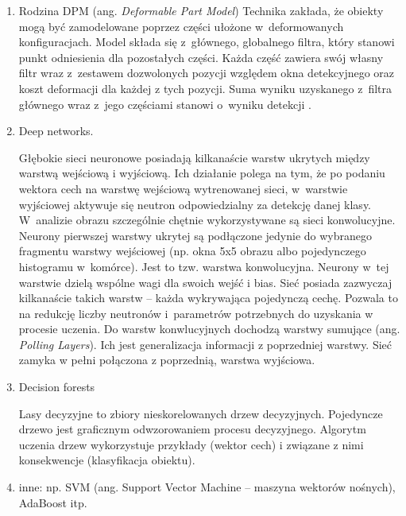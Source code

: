 \begin{enumerate}
\item Rodzina DPM (ang. \textit{Deformable Part Model})
%
Technika zakłada, że obiekty mogą być zamodelowane poprzez części ułożone w~deformowanych konfiguracjach. 
Model składa się z~głównego, globalnego filtra, który stanowi punkt odniesienia dla pozostałych części. 
Każda część zawiera swój własny filtr wraz z~zestawem dozwolonych pozycji względem okna detekcyjnego oraz koszt deformacji dla każdej z tych pozycji. 
Suma wyniku uzyskanego z~filtra głównego wraz z~jego częściami stanowi o~wyniku detekcji \cite{felzenszwalb2008discriminatively}.

\item Deep networks.

Głębokie sieci neuronowe posiadają kilkanaście warstw ukrytych między warstwą wejściową i wyjściową. 
Ich działanie polega na tym, że po podaniu wektora cech na warstwę wejściową wytrenowanej sieci, w~warstwie wyjściowej aktywuje się neutron odpowiedzialny za detekcję danej klasy. 
W~analizie obrazu szczególnie chętnie wykorzystywane są sieci konwolucyjne. 
Neurony pierwszej warstwy ukrytej są podłączone jedynie do wybranego fragmentu warstwy wejściowej (np. okna 5x5 obrazu albo pojedynczego histogramu w~komórce). %
Jest to tzw. warstwa konwolucyjna. 
Neurony w~tej warstwie dzielą wspólne wagi dla swoich wejść i bias. 
Sieć posiada zazwyczaj kilkanaście takich warstw -- każda wykrywająca pojedynczą cechę. 
Pozwala to na redukcję liczby neutronów i~parametrów potrzebnych do uzyskania w procesie uczenia. 
Do warstw konwlucyjnych dochodzą warstwy sumujące (ang. \textit{Polling Layers}). 
Ich jest generalizacja informacji z poprzedniej warstwy. 
Sieć zamyka w pełni połączona z poprzednią, warstwa wyjściowa.

\item Decision forests

Lasy decyzyjne to zbiory nieskorelowanych drzew decyzyjnych. 
Pojedyncze drzewo jest graficznym odwzorowaniem procesu decyzyjnego. 
Algorytm uczenia drzew wykorzystuje przykłady (wektor cech) i związane z nimi konsekwencje (klasyfikacja obiektu).


\item inne: np. SVM (ang. Support Vector Machine -- maszyna wektorów nośnych), AdaBoost itp.


\end{enumerate}


